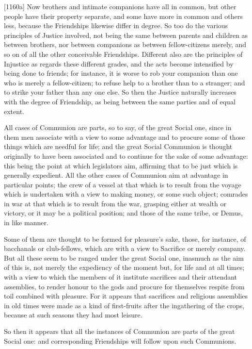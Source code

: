 [1160a] Now brothers and intimate companions have all in common, but
other people have their property separate, and some have more in common
and others less, because the Friendships likewise differ in degree. So
too do the various principles of Justice involved, not being the same
between parents and children as between brothers, nor between companions
as between fellow-citizens merely, and so on of all the other
conceivable Friendships. Different also are the principles of Injustice
as regards these different grades, and the acts become intensified by
being done to friends; for instance, it is worse to rob your companion
than one who is merely a fellow-citizen; to refuse help to a brother
than to a stranger; and to strike your father than any one else. So then
the Justice naturally increases with the degree of Friendship, as being
between the same parties and of equal extent.

All cases of Communion are parts, so to say, of the great Social one,
since in them men associate with a view to some advantage and to procure
some of those things which are needful for life; and the great Social
Communion is thought originally to have been associated and to
continue for the sake of some advantage: this being the point at which
legislators aim, affirming that to be just which is generally expedient.
All the other cases of Communion aim at advantage in particular points;
the crew of a vessel at that which is to result from the voyage which is
undertaken with a view to making money, or some such object; comrades in
war at that which is to result from the war, grasping either at wealth
or victory, or it may be a political position; and those of the same
tribe, or Demus, in like manner.

Some of them are thought to be formed for pleasure's sake, those, for
instance, of bacchanals or club-fellows, which are with a view to
Sacrifice or merely company. But all these seem to be ranged under
the great Social one, inasmuch as the aim of this is, not merely the
expediency of the moment but, for life and at all times; with a view
to which the members of it institute sacrifices and their attendant
assemblies, to render honour to the gods and procure for themselves
respite from toil combined with pleasure. For it appears that
sacrifices and religious assemblies in old times were made as a kind of
first-fruits after the ingathering of the crops, because at such seasons
they had most leisure.

So then it appears that all the instances of Communion are parts of the
great Social one: and corresponding Friendships will follow upon such
Communions.



